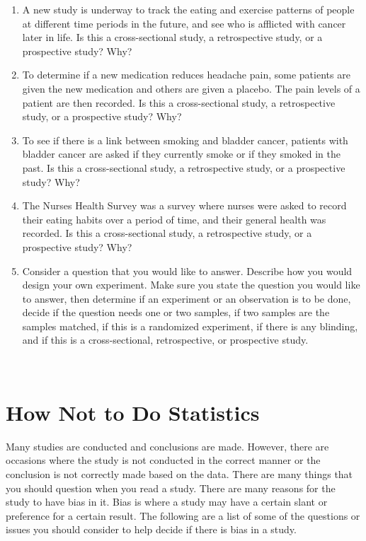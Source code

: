 \documentclass[
]{book}
\begin{document}
\begin{enumerate}
\item
  A new study is underway to track the eating and exercise patterns of people at different time periods in the future, and see who is afflicted with cancer later in life. Is this a cross-sectional study, a retrospective study, or a prospective study? Why?
\item
  To determine if a new medication reduces headache pain, some patients are given the new medication and others are given a placebo. The pain levels of a patient are then recorded. Is this a cross-sectional study, a retrospective study, or a prospective study? Why?
\item
  To see if there is a link between smoking and bladder cancer, patients with bladder cancer are asked if they currently smoke or if they smoked in the past. Is this a cross-sectional study, a retrospective study, or a prospective study? Why?
\item
  The Nurses Health Survey was a survey where nurses were asked to record their eating habits over a period of time, and their general health was recorded. Is this a cross-sectional study, a retrospective study, or a prospective study? Why?
\item
  Consider a question that you would like to answer. Describe how you would design your own experiment. Make sure you state the question you would like to answer, then determine if an experiment or an observation is to be done, decide if the question needs one or two samples, if two samples are the samples matched, if this is a randomized experiment, if there is any blinding, and if this is a cross-sectional, retrospective, or prospective study.
\end{enumerate}

\textbf{\\
}

\hypertarget{how-not-to-do-statistics}{%
\section{How Not to Do Statistics}\label{how-not-to-do-statistics}}

Many studies are conducted and conclusions are made. However, there are occasions where the study is not conducted in the correct manner or the conclusion is not correctly made based on the data. There are many things that you should question when you read a study. There are many reasons for the study to have bias in it. Bias is where a study may have a certain slant or preference for a certain result. The following are a list of some of the questions or issues you should consider to help decide if there is bias in a study.
\end{document}
